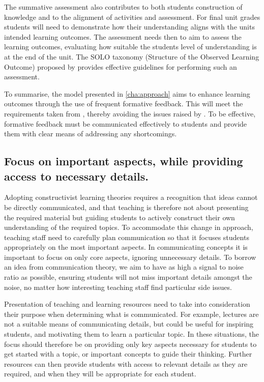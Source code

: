 The summative assessment also contributes to both students construction of knowledge and to the alignment of activities and assessment. For final unit grades students will need to demonstrate how their understanding aligns with the units intended learning outcomes. The assessment needs then to aim to assess the learning outcomes, evaluating how suitable the students level of understanding is at the end of the unit. The SOLO taxonomy (Structure of the Observed Learning Outcome) proposed by \citet{Biggs:1982} provides effective guidelines for performing such an assessment.

To summarise, the model presented in \cref{cha:approach} aims to enhance learning outcomes through the use of frequent formative feedback. This will meet the requirements taken from \citet{Gibbs:2004}, thereby avoiding the issues raised by \citet{Smith:2005}. To be effective, formative feedback must be communicated effectively to students and provide them with clear means of addressing any shortcomings.


\subsection{Focus on important aspects, while providing access to necessary details.} %
\label{ssub:focus_on_important_aspects}

Adopting constructivist learning theories requires a recognition that ideas cannot be directly communicated, and that teaching is therefore not about presenting the required material but guiding students to actively construct their own understanding of the required topics. To accommodate this change in approach, teaching staff need to carefully plan communication so that it focuses students appropriately on the most important aspects. In communicating concepts it is important to focus on only core aspects, ignoring unnecessary details. To borrow an idea from communication theory, we aim to have as high a signal to noise ratio \cite{Shannon:1949} as possible, ensuring students will not miss important details amongst the noise, no matter how interesting teaching staff find particular side issues.

Presentation of teaching and learning resources need to take into consideration their purpose when determining what is communicated. For example, lectures are not a suitable means of communicating details, but could be useful for inspiring students, and motivating them to learn a particular topic. In these situations, the focus should therefore be on providing only key aspects necessary for students to get started with a topic, or important concepts to guide their thinking. Further resources can then provide students with access to relevant details as they are required, and when they will be appropriate for each student.

